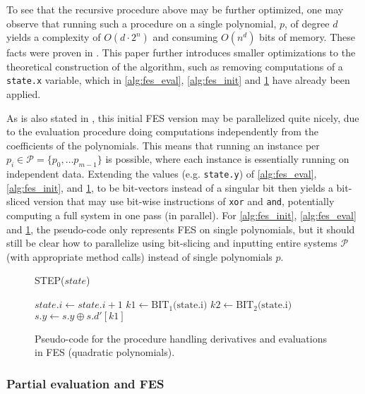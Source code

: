 To see that the recursive procedure above may be further optimized, one may observe that running such a procedure on a single polynomial, $p$, of degree $d$ yields a complexity of $O(d\cdot2^n)$ and consuming $O(n^d)$ bits of memory. These facts were proven in \cite{ches-2010-23990}. This paper further introduces smaller optimizations to the theoretical construction of the algorithm, such as removing computations of a \texttt{state.x} variable, which in \cref{alg:fes_eval}, \ref{alg:fes_init} and \ref{alg:fes_step} have already been applied. 

As is also stated in \cite{ches-2010-23990}, this initial FES version may be parallelized quite nicely, due to the evaluation procedure doing computations independently from the coefficients of the polynomials. This means that running an instance per $p_i \in \mathcal{P} = \{p_0, \dots p_{m-1}\}$ is possible, where each instance is essentially running on independent data. Extending the values (e.g. \texttt{state.y}) of \cref{alg:fes_eval}, \ref{alg:fes_init}, and \ref{alg:fes_step}, to be bit-vectors instead of a singular bit then yields a bit-sliced version that may use bit-wise instructions of \texttt{xor} and \texttt{and}, potentially computing a full system in one pass (in parallel). For \cref{alg:fes_init}, \cref{alg:fes_eval} and \cref{alg:fes_step}, the pseudo-code only represents FES on single polynomials, but it should still be clear how to parallelize using bit-slicing and inputting entire systems $\mathcal{P}$ (with appropriate method calls) instead of single polynomials $p$. 

\begin{figure}[t]
    \begin{alg}
        \caption{STEP($state$)} \label{alg:fes_step}
        $state.i \gets state.i + 1$\;
        $k1 \gets \text{BIT}_1\text{(state.i)}$\;
        $k2 \gets \text{BIT}_2\text{(state.i)}$\;
        $s.y \gets s.y \oplus s.d'[k1]$\;
    \end{alg}
    \caption{Pseudo-code for the procedure handling derivatives and evaluations in FES (quadratic polynomials).}
\end{figure}

\subsubsection{Partial evaluation and FES}

